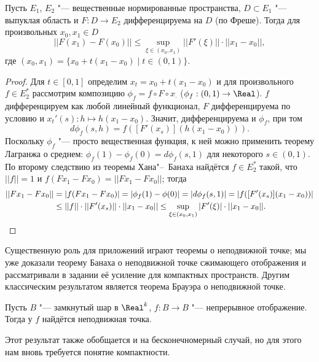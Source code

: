 \documentclass[main]{subfiles}
\begin{document}
\begin{theorem}
  Пусть \( E_1 \), \( E_2 \) "--- вещественные
  нормированные пространства,
  \( D \subset E_1 \) "--- выпуклая область
  и \( F : D \to E_2 \) дифференцируема на \( D \)
  (по Фреше).
  Тогда для произвольных \( x_0, x_1 \in D \)
  \[
    ||F(x_1) - F(x_0)|| \le \sup_{\xi \in (x_0, x_1)} ||F'(\xi)|| \cdot ||x_1 - x_0||,
  \]
  где \( (x_0, x_1) = \{ x_0 + t (x_1 - x_0) \mid t \in (0, 1) \} \).
\end{theorem}
\begin{proof}
  Для \( t \in [0, 1] \) определим
  \( x_t = x_0 + t (x_1 - x_0) \) и
  для произвольного \( f \in E_2^* \)
  рассмотрим композицию
  \( \phi_f = f \circ F \circ x_{\boldsymbol{\cdot}} \)
  (\( \phi_f : (0, 1) \to \Real \)).
  \( f \) дифференцируем как любой линейный функционал,
  \( F \) дифференцируема по условию
  и \( x_t'(s) : h \mapsto h (x_1 - x_0) \).
  Значит, дифференцируема и \( \phi_f \),
  при том
  \[
    d\phi_f(s, h) =
    f([F'(x_s)] (h (x_1 - x_0))).
  \]
  Поскольку \( \phi_f \) "--- просто
  вещественная функция,
  к ней можно применить теорему Лагранжа о среднем:
  \( \phi_f(1) - \phi_f(0) = d \phi_f(s, 1) \)
  для некоторого \( s \in (0, 1) \).
  По второму следствию из теоремы Хана"--~Банаха
  найдётся \( f \in E_2^* \) такой,
  что \( ||f|| = 1 \) и \( f(F x_1 - F x_0) =
  ||F x_1 - F x_0|| \);
  тогда
  \begin{align}
    ||F x_1 - F x_0|| &= |f(F x_1 - F x_0)| =
    |\phi_f(1) - \phi(0)| =
    |d \phi_f (s, 1)| = 
    |f([F'(x_s)](x_1 - x_0))| \\ 
    &\le ||f|| \cdot ||F'(x_s)|| \cdot ||x_1 - x_0|| \le
    \sup_{\xi \in (x_0, x_1)} |F'(\xi)| \cdot ||x_1 - x_0||.
    \qedhere
  \end{align}
\end{proof}

Существенную роль для приложений играют
теоремы о неподвижной точке;
мы уже доказали теорему Банаха о
неподвижной точке сжимающего отображения
и рассматривали в задании
её усиление для компактных пространств.
Другим классическим результатом
является теорема Брауэра о неподвижной точке.

\begin{theorem*}[Брауэр, 1910]
  Пусть \( B \) "--- замкнутый шар в \( \Real^k \),
  \( f : B \to B \) "--- непрерывное отображение.
  Тогда у \( f \) найдётся неподвижная точка.
\end{theorem*}

Этот результат также обобщается
и на бесконечномерный случай,
но для этого нам вновь требуется
понятие компактности.
\end{document}
